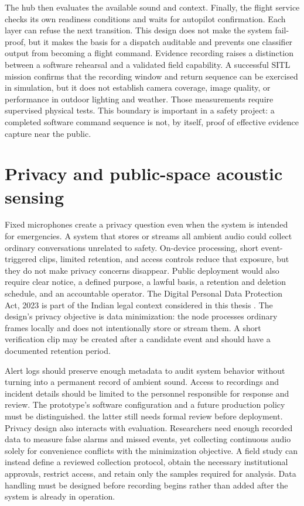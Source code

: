 \documentclass[12pt,a4paper]{report}
\begin{document}
The hub then evaluates the available sound and context. Finally, the flight service checks its own readiness conditions and waits for autopilot confirmation. Each layer can refuse the next transition. This design does not make the system fail-proof, but it makes the basis for a dispatch auditable and prevents one classifier output from becoming a flight command. Evidence recording raises a distinction between a software rehearsal and a validated field capability. A successful SITL mission confirms that the recording window and return sequence can be exercised in simulation, but it does not establish camera coverage, image quality, or performance in outdoor lighting and weather. Those measurements require supervised physical tests. This boundary is important in a safety project: a completed software command sequence is not, by itself, proof of effective evidence capture near the public.

\section{Privacy and public-space acoustic sensing}

Fixed microphones create a privacy question even when the system is intended for emergencies. A system that stores or streams all ambient audio could collect ordinary conversations unrelated to safety. On-device processing, short event-triggered clips, limited retention, and access controls reduce that exposure, but they do not make privacy concerns disappear. Public deployment would also require clear notice, a defined purpose, a lawful basis, a retention and deletion schedule, and an accountable operator. The Digital Personal Data Protection Act, 2023 is part of the Indian legal context considered in this thesis \cite{dpdp}. The design's privacy objective is data minimization: the node processes ordinary frames locally and does not intentionally store or stream them. A short verification clip may be created after a candidate event and should have a documented retention period.

Alert logs should preserve enough metadata to audit system behavior without turning into a permanent record of ambient sound. Access to recordings and incident details should be limited to the personnel responsible for response and review. The prototype's software configuration and a future production policy must be distinguished. the latter still needs formal review before deployment. Privacy design also interacts with evaluation. Researchers need enough recorded data to measure false alarms and missed events, yet collecting continuous audio solely for convenience conflicts with the minimization objective. A field study can instead define a reviewed collection protocol, obtain the necessary institutional approvals, restrict access, and retain only the samples required for analysis. Data handling must be designed before recording begins rather than added after the system is already in operation.
\end{document}
